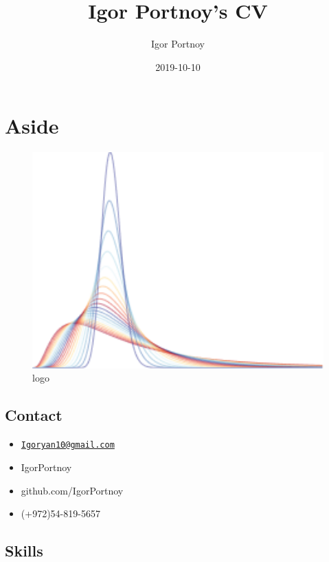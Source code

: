 \documentclass[]{article}
\title{Igor Portnoy's CV}
\author{Igor Portnoy}
\date{2019-10-10}
\providecommand{\tightlist}{%
  \setlength{\itemsep}{0pt}\setlength{\parskip}{0pt}}
\begin{document}
\maketitle

\hypertarget{aside}{%
\section{Aside}\label{aside}}

\begin{figure}
\centering
\includegraphics[width=1\textwidth,height=\textheight]{beta_dist.png}
\caption{logo}
\end{figure}

\hypertarget{contact}{%
\subsection{Contact}\label{contact}}

\begin{itemize}
\tightlist
\item
  \href{mailto:Igoryan10@gmail.com}{\nolinkurl{Igoryan10@gmail.com}}
\item
  IgorPortnoy
\item
  github.com/IgorPortnoy
\item
  (+972)54-819-5657
\end{itemize}

\hypertarget{skills}{%
\subsection{Skills}\label{skills}}
\end{document}
